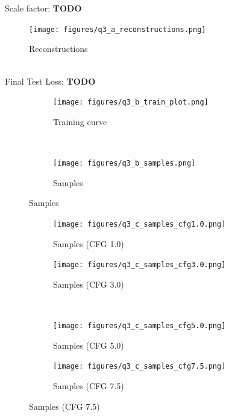 \documentclass{article}
\begin{document}
\newpage
{}\\

\\
Scale factor: \textbf{TODO} \\
\begin{figure}[H]
    \centering
    \texttt{[image: figures/q3\_a\_reconstructions.png]}
    \caption{Reconstructions}
\end{figure}

\newpage
{}\\
Final Test Loss: \textbf{TODO} \\
\begin{figure}[H]
    \centering
    \begin{subfigure}{0.7\textwidth}
        \centering
        \texttt{[image: figures/q3\_b\_train\_plot.png]}
        \caption{Training curve}
    \end{subfigure}
    \\
    \begin{subfigure}{0.7\textwidth}
        \centering
        \texttt{[image: figures/q3\_b\_samples.png]}
        \caption{Samples}
    \end{subfigure}
\end{figure}

\newpage
{}
\begin{figure}[H]
    \centering
    \begin{subfigure}{0.45\textwidth}
        \centering
        \texttt{[image: figures/q3\_c\_samples\_cfg1.0.png]}
        \caption{Samples (CFG 1.0)}
    \end{subfigure}
    \begin{subfigure}{0.45\textwidth}
        \centering
        \texttt{[image: figures/q3\_c\_samples\_cfg3.0.png]}
        \caption{Samples (CFG 3.0)}
    \end{subfigure}
    \\
    \begin{subfigure}{0.45\textwidth}
        \centering
        \texttt{[image: figures/q3\_c\_samples\_cfg5.0.png]}
        \caption{Samples (CFG 5.0)}
    \end{subfigure}
    \begin{subfigure}{0.45\textwidth}
        \centering
        \texttt{[image: figures/q3\_c\_samples\_cfg7.5.png]}
        \caption{Samples (CFG 7.5)}
    \end{subfigure}
\end{figure}
\end{document}
